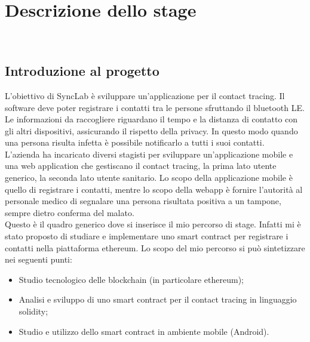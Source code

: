 
\chapter{Descrizione dello stage}
\label{cap:descrizione-stage}

\\

\section{Introduzione al progetto}
L’obiettivo di SyncLab è sviluppare un’applicazione per il contact tracing.
Il software deve poter registrare i contatti tra le persone sfruttando il bluetooth LE. Le informazioni da raccogliere riguardano il tempo e la distanza di contatto con gli altri dispositivi, assicurando il rispetto della privacy. In questo modo quando una persona risulta infetta è possibile notificarlo a tutti i suoi contatti.\\

L’azienda ha incaricato diversi stagisti per sviluppare un’applicazione mobile e una web application che gestiscano il contact tracing, la prima lato utente generico, la seconda lato utente sanitario. 
Lo scopo della applicazione mobile è quello di registrare i contatti, mentre lo scopo della webapp è fornire l’autorità al personale medico di segnalare una persona risultata positiva a un tampone, sempre dietro conferma del malato.\\

Questo è il quadro generico dove si inserisce il mio percorso di stage.
Infatti mi è stato proposto di studiare e implementare uno smart contract per registrare i contatti nella piattaforma ethereum. 
Lo scopo del mio percorso si può sintetizzare nei seguenti punti:
\begin{itemize}
	\item{Studio tecnologico delle blockchain (in particolare ethereum);}
	\item{Analisi e sviluppo di uno smart contract per il contact tracing in linguaggio solidity;}
	\item{Studio e utilizzo dello smart contract in ambiente mobile (Android).}
\end{itemize}

